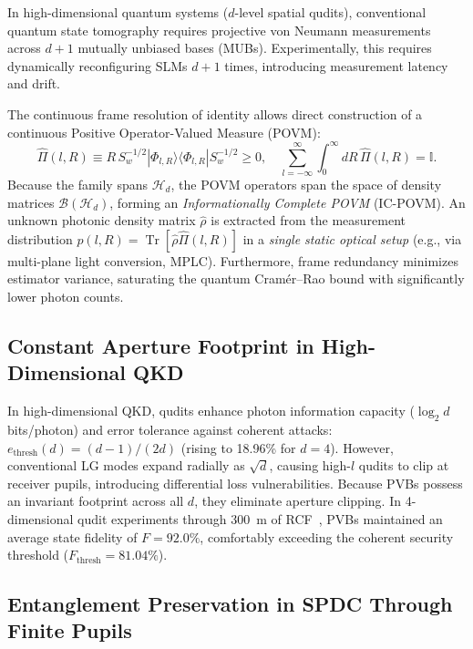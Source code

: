 \documentclass[11pt,a4paper]{article}
\begin{document}
In high-dimensional quantum systems ($d$-level spatial qudits), conventional quantum state tomography requires projective von Neumann measurements across $d+1$ mutually unbiased bases (MUBs). Experimentally, this requires dynamically reconfiguring SLMs $d+1$ times, introducing measurement latency and drift.

The continuous frame resolution of identity allows direct construction of a continuous Positive Operator-Valued Measure (POVM):
\begin{equation}
\boxed{\hat{\Pi}(l, R) \equiv R \, S_w^{-1/2} |\Phi_{l, R}\rangle \langle \Phi_{l, R}| S_w^{-1/2} \ge 0, \quad \sum_{l=-\infty}^\infty \int_0^\infty dR \, \hat{\Pi}(l, R) = \mathbb{I}.}
\label{eq:povm_def}
\end{equation}
Because the family spans $\mathcal{H}_d$, the POVM operators span the space of density matrices $\mathcal{B}(\mathcal{H}_d)$, forming an \emph{Informationally Complete POVM} (IC-POVM). An unknown photonic density matrix $\hat{\rho}$ is extracted from the measurement distribution $p(l, R) = \operatorname{Tr}[\hat{\rho} \hat{\Pi}(l, R)]$ in a \emph{single static optical setup} (e.g., via multi-plane light conversion, MPLC). Furthermore, frame redundancy minimizes estimator variance, saturating the quantum Cram{\'e}r--Rao bound with significantly lower photon counts.

\subsection{Constant Aperture Footprint in High-Dimensional QKD}

In high-dimensional QKD, qudits enhance photon information capacity ($\log_2 d$ bits/photon) and error tolerance against coherent attacks: $e_{\text{thresh}}(d) = (d-1)/(2d)$ (rising to 18.96\% for $d=4$). However, conventional LG modes expand radially as $\sqrt{d}$, causing high-$l$ qudits to clip at receiver pupils, introducing differential loss vulnerabilities. Because PVBs possess an invariant footprint across all $d$, they eliminate aperture clipping. In 4-dimensional qudit experiments through 300~m of RCF~\cite{Villalba2023}, PVBs maintained an average state fidelity of $F = 92.0\%$, comfortably exceeding the coherent security threshold ($F_{\text{thresh}} = 81.04\%$).

\subsection{Entanglement Preservation in SPDC Through Finite Pupils}
\end{document}
